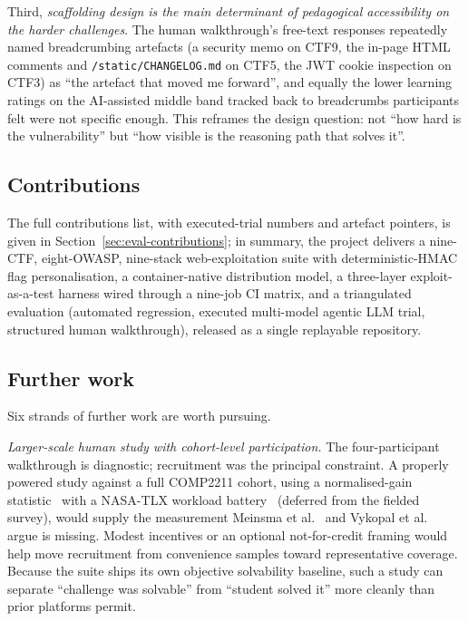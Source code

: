 Third, \textit{scaffolding design is the main determinant of
pedagogical accessibility on the harder challenges}. The
human walkthrough's free-text responses repeatedly named
breadcrumbing artefacts (a security memo on CTF9, the
in-page HTML comments and \texttt{/static/CHANGELOG.md} on
CTF5, the JWT cookie inspection on CTF3) as ``the artefact
that moved me forward'', and equally the lower learning
ratings on the AI-assisted middle band tracked back to
breadcrumbs participants felt were not specific enough. This
reframes the design question: not ``how hard is the
vulnerability'' but ``how visible is the reasoning path that
solves it''.

\subsection{Contributions}

The full contributions list, with executed-trial numbers and
artefact pointers, is given in
Section~\ref{sec:eval-contributions}; in summary, the project
delivers a nine-CTF, eight-OWASP, nine-stack web-exploitation
suite with deterministic-HMAC flag personalisation, a
container-native distribution model, a three-layer
exploit-as-a-test harness wired through a nine-job CI matrix,
and a triangulated evaluation (automated regression, executed
multi-model agentic LLM trial, structured human walkthrough),
released as a single replayable repository.

\subsection{Further work}

Six strands of further work are worth pursuing.

\textit{Larger-scale human study with cohort-level
participation.} The four-participant walkthrough is
diagnostic; recruitment was the principal constraint. A
properly powered study against a full COMP2211 cohort, using a
normalised-gain statistic~\cite{hake1998} with a NASA-TLX
workload battery~\cite{HartStaveland1988} (deferred from the
fielded survey), would supply the measurement
Meinsma et al.~\cite{Meinsma2022} and
Vykopal et al.~\cite{Vykopal} argue is missing. Modest
incentives or an optional not-for-credit framing would help
move recruitment from convenience samples toward
representative coverage. Because the suite ships its own
objective solvability baseline, such a study can separate
``challenge was solvable'' from ``student solved it'' more
cleanly than prior platforms permit.

